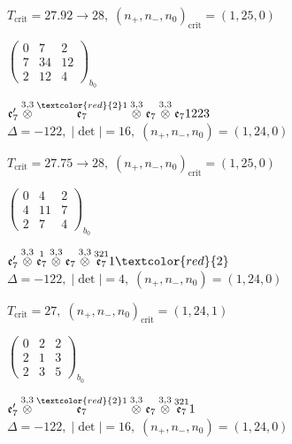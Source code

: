 \documentclass[10pt]{article}
\begin{document}
\hspace{1em}$T_{\text{crit}}=27.92 \to 28,\; (n_+,n_-,n_0)_{\text{crit}}=(1,25,0)$

\hspace{2em}$\left(\begin{smallmatrix}0 & 7 & 2 \\ 7 & 34 & 12 \\ 2 & 12 & 4\end{smallmatrix}\right)_{\!b_0}$

\smallskip

$\mathfrak{e}_7'\overset{3,3}{\otimes}\overset{\textcolor{red}{2}1}{\mathfrak{e}_7}\overset{3,3}{\otimes}\mathfrak{e}_7\overset{3,3}{\otimes}\mathfrak{e}_71223$ \quad $\Delta=-122,\; |\det|=16,\; (n_+,n_-,n_0)=(1,24,0)$

\hspace{1em}$T_{\text{crit}}=27.75 \to 28,\; (n_+,n_-,n_0)_{\text{crit}}=(1,25,0)$

\hspace{2em}$\left(\begin{smallmatrix}0 & 4 & 2 \\ 4 & 11 & 7 \\ 2 & 7 & 4\end{smallmatrix}\right)_{\!b_0}$

\smallskip

$\mathfrak{e}_7'\overset{3,3}{\otimes}\overset{1}{\mathfrak{e}_7}\overset{3,3}{\otimes}\mathfrak{e}_7\overset{3,3}{\otimes}\overset{321}{\mathfrak{e}_7}1\textcolor{red}{2}$ \quad $\Delta=-122,\; |\det|=4,\; (n_+,n_-,n_0)=(1,24,0)$

\hspace{1em}$T_{\text{crit}}=27,\; (n_+,n_-,n_0)_{\text{crit}}=(1,24,1)$

\hspace{2em}$\left(\begin{smallmatrix}0 & 2 & 2 \\ 2 & 1 & 3 \\ 2 & 3 & 5\end{smallmatrix}\right)_{\!b_0}$

$\mathfrak{e}_7'\overset{3,3}{\otimes}\overset{\textcolor{red}{2}1}{\mathfrak{e}_7}\overset{3,3}{\otimes}\mathfrak{e}_7\overset{3,3}{\otimes}\overset{321}{\mathfrak{e}_7}1$ \quad $\Delta=-122,\; |\det|=16,\; (n_+,n_-,n_0)=(1,24,0)$
\end{document}
